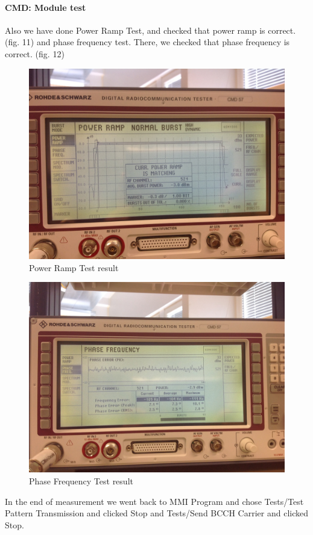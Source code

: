 \documentclass[english]{article}
\begin{document}
\paragraph{CMD: Module test}
Also we have done Power Ramp Test, and checked that power ramp is correct. (fig. 11) and
phase frequency test. There, we checked that phase frequency is correct. (fig. 12)
\begin{figure}
\centerline{\includegraphics[scale=0.1]{GSM/Pic11}}
\caption{Power Ramp Test result}
\end{figure}
\begin{figure}
\centerline{\includegraphics[scale=0.1]{GSM/Pic12}}
\caption{Phase Frequency Test result}
\end{figure}
In the end of measurement we went back to MMI Program and chose Tests/Test Pattern Transmission and clicked Stop and Tests/Send BCCH Carrier and clicked Stop.
\end{document}
